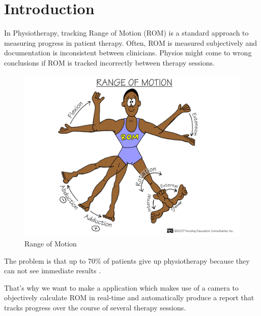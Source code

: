 \chapter{Introduction}
\par In Physiotherapy, tracking Range of Motion (ROM) is a standard approach to measuring progress in patient therapy. Often, ROM is measured subjectively and documentation is inconsistent between clinicians. Physios might come to wrong conclusions if ROM is tracked incorrectly between therapy sessions.

\begin{figure}[htbp]
	\centerline{\includegraphics[scale=0.25]{fig/rangeofmotion.png}}  
	\caption{Range of Motion}
\end{figure}

\par The problem is that up to 70\% of patients give up physiotherapy because they can not see immediate results \cite{7FactsInPhysicalTherapy}.
\par That's why we want to make a application which makes use of a camera to objectively calculate ROM in real-time and automatically produce a report that tracks progress over the course of several therapy sessions.

